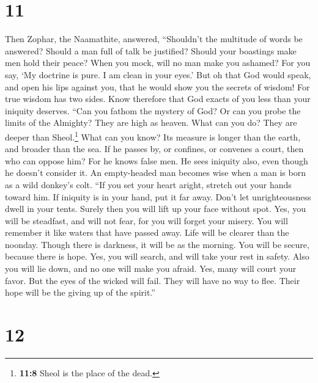 \hypertarget{section-9}{%
\section{11}\label{section-9}}

 Then Zophar, the Naamathite, answered, 
``Shouldn't the multitude of words be answered? Should a man full of
talk be justified?  Should your boastings make men hold
their peace? When you mock, will no man make you ashamed? 
For you say, `My doctrine is pure. I am clean in your eyes.'
 But oh that God would speak, and open his lips against
you,  that he would show you the secrets of wisdom! For
true wisdom has two sides. Know therefore that God exacts of you less
than your iniquity deserves.  ``Can you fathom the mystery
of God? Or can you probe the limits of the Almighty?  They
are high as heaven. What can you do? They are deeper than
Sheol.\footnote{\textbf{11:8} Sheol is the place of the dead.} What can
you know?  Its measure is longer than the earth, and
broader than the sea.  If he passes by, or confines, or
convenes a court, then who can oppose him?  For he knows
false men. He sees iniquity also, even though he doesn't consider it.
 An empty-headed man becomes wise when a man is born as a
wild donkey's colt.  ``If you set your heart aright,
stretch out your hands toward him.  If iniquity is in
your hand, put it far away. Don't let unrighteousness dwell in your
tents.  Surely then you will lift up your face without
spot. Yes, you will be steadfast, and will not fear,  for
you will forget your misery. You will remember it like waters that have
passed away.  Life will be clearer than the noonday.
Though there is darkness, it will be as the morning.  You
will be secure, because there is hope. Yes, you will search, and will
take your rest in safety.  Also you will lie down, and no
one will make you afraid. Yes, many will court your favor.
 But the eyes of the wicked will fail. They will have no
way to flee. Their hope will be the giving up of the spirit.''

\hypertarget{section-10}{%
\section{12}\label{section-10}}

